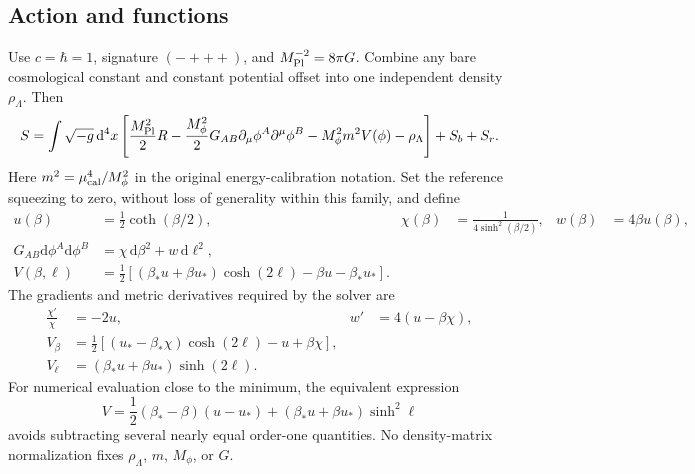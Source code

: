 \documentclass[11pt]{article}
\newcommand{\dd}{\mathrm d}
\newcommand{\mpl}{M_{\rm Pl}}
\newcommand{\mf}{M_\phi}
\begin{document}
\subsection{Action and functions}
Use $c=\hbar=1$, signature $(-+++)$, and $\mpl^{-2}=8\pi G$. Combine any bare cosmological constant and constant potential offset into one independent density $\rho_\Lambda$. Then
\begin{equation}
 S=\int\sqrt{-g}\,\dd^4x\left[\frac{\mpl^2}{2}R
 -\frac{\mf^2}{2}G_{AB}\partial_\mu\phi^A\partial^\mu\phi^B
 -\mf^2m^2 V(\phi)-\rho_\Lambda\right]+S_b+S_r .
 \label{ext:action}
\end{equation}
Here $m^2=\mu_{\rm cal}^4/\mf^2$ in the original energy-calibration notation. Set the reference squeezing to zero, without loss of generality within this family, and define
\begin{align}
 u(\beta)&=\frac12\coth(\beta/2),&
 \chi(\beta)&=\frac{1}{4\sinh^2(\beta/2)},&
 w(\beta)&=4\beta u(\beta),\\
 G_{AB}\dd\phi^A\dd\phi^B&=\chi\,\dd\beta^2+w\,\dd\ell^2,\\
 V(\beta,\ell)&=\frac12\left[(\beta_*u+\beta u_*)\cosh(2\ell)
                   -\beta u-\beta_*u_*\right].\label{ext:potential}
\end{align}
The gradients and metric derivatives required by the solver are
\begin{align}
 \frac{\chi'}{\chi}&=-2u,& w'&=4(u-\beta\chi),\\
 V_\beta&=\frac12\left[(u_*-\beta_*\chi)\cosh(2\ell)-u+\beta\chi\right],\\
 V_\ell&=(\beta_*u+\beta u_*)\sinh(2\ell).
\end{align}
For numerical evaluation close to the minimum, the equivalent expression
\begin{equation}
 V=\frac12(\beta_*-\beta)(u-u_*)+
       (\beta_*u+\beta u_*)\sinh^2\ell
\end{equation}
avoids subtracting several nearly equal order-one quantities. No density-matrix normalization fixes $\rho_\Lambda$, $m$, $\mf$, or $G$.
\end{document}
